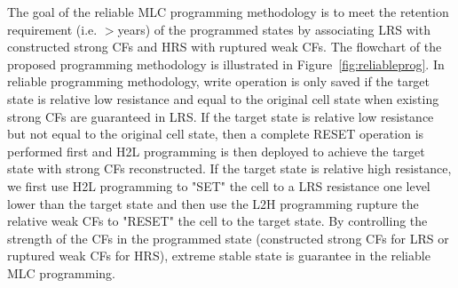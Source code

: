 The goal of the reliable MLC programming methodology is to meet the retention requirement (i.e. $>$years) of the programmed states by associating LRS with constructed strong CFs and HRS with ruptured weak CFs. The flowchart of the proposed programming methodology is illustrated in Figure~\ref{fig:reliableprog}. In reliable programming methodology, write operation is only saved if the target state is relative low resistance and equal to the original cell state when existing strong CFs are guaranteed in LRS. If the target state is relative low resistance but not equal to the original cell state, then a complete RESET operation is performed first and H2L programming is then deployed to achieve the target state with strong CFs reconstructed. If the target state is relative high resistance, we first use H2L programming to "SET" the cell to a LRS resistance one level lower than the target state and then use the L2H programming rupture the relative weak CFs to "RESET" the cell to the target state. By controlling the strength of the CFs in the programmed state (constructed strong CFs for LRS or ruptured weak CFs for HRS), extreme stable state is guarantee in the reliable MLC programming.

